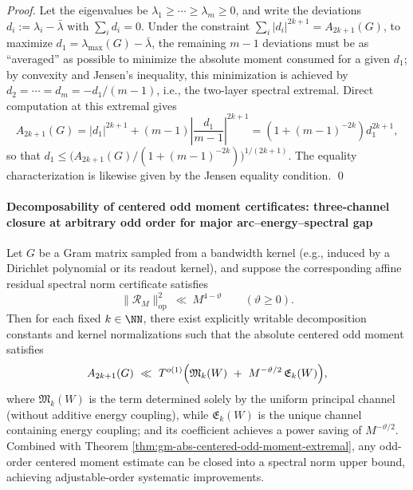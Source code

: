 \begin{proof}
Let the eigenvalues be \(\lambda_1\ge\cdots\ge\lambda_m\ge 0\), and write the deviations \(d_i:=\lambda_i-\bar\lambda\) with \(\sum_i d_i=0\).
Under the constraint \(\sum_i|d_i|^{2k+1}=A_{2k+1}(G)\), to maximize \(d_1=\lambda_{\max}(G)-\bar\lambda\), the remaining \(m-1\) deviations must be as ``averaged'' as possible to minimize the absolute moment consumed for a given \(d_1\); by convexity and Jensen's inequality, this minimization is achieved by
\(
d_2=\cdots=d_m=-d_1/(m-1)
\),
i.e., the two-layer spectral extremal.
Direct computation at this extremal gives
\[
A_{2k+1}(G)
=|d_1|^{2k+1}+(m-1)\left|\frac{d_1}{m-1}\right|^{2k+1}
=\left(1+(m-1)^{-2k}\right)d_1^{2k+1},
\]
so that \(d_1\le \bigl(A_{2k+1}(G)/(1+(m-1)^{-2k})\bigr)^{1/(2k+1)}\).
The equality characterization is likewise given by the Jensen equality condition. \qed
\end{proof}

\paragraph{Decomposability of centered odd moment certificates: three-channel closure at arbitrary odd order for major arc--energy--spectral gap}
\begin{proposition}\label{prop:gm-abs-centered-moment-three-channels}
Let \(G\) be a Gram matrix sampled from a bandwidth kernel (e.g., induced by a Dirichlet polynomial or its readout kernel), and suppose the corresponding affine residual spectral norm certificate satisfies
\[
\|\mathcal{R}_M\|_{\mathrm{op}}^2\ \ll\ M^{4-\vartheta}\qquad(\vartheta\ge 0).
\]
Then for each fixed \(k\in\NN\), there exist explicitly writable decomposition constants and kernel normalizations such that the absolute centered odd moment satisfies
\[
A_{2k+1}(G)\ \ll\ T^{o(1)}
\Bigl(
\mathfrak{M}_k(W)\ +\ M^{-\vartheta/2}\,\mathfrak{E}_k(W)
\Bigr),
\]
where \(\mathfrak{M}_k(W)\) is the term determined solely by the uniform principal channel (without additive energy coupling), while \(\mathfrak{E}_k(W)\) is the unique channel containing energy coupling; and its coefficient achieves a power saving of \(M^{-\vartheta/2}\).
Combined with Theorem \ref{thm:gm-abs-centered-odd-moment-extremal}, any odd-order centered moment estimate can be closed into a spectral norm upper bound, achieving adjustable-order systematic improvements.
\end{proposition}

